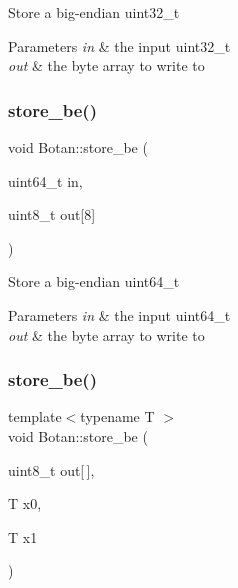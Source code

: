 Store a big-\/endian uint32\+\_\+t 
\begin{DoxyParams}{Parameters}
{\em in} & the input uint32\+\_\+t \\
\hline
{\em out} & the byte array to write to \\
\hline
\end{DoxyParams}
\mbox{\label{namespace_botan_af55277e5a97f10bb1f19a121bfcce030}} 
\subsubsection{\texorpdfstring{store\+\_\+be()}{store\_be()}\hspace{0.1cm}{\footnotesize\ttfamily [3/6]}}
{\footnotesize\ttfamily void Botan\+::store\+\_\+be (\begin{DoxyParamCaption}\item[{uint64\+\_\+t}]{in,  }\item[{uint8\+\_\+t}]{out\mbox{[}8\mbox{]} }\end{DoxyParamCaption})\hspace{0.3cm}{\ttfamily [inline]}}

Store a big-\/endian uint64\+\_\+t 
\begin{DoxyParams}{Parameters}
{\em in} & the input uint64\+\_\+t \\
\hline
{\em out} & the byte array to write to \\
\hline
\end{DoxyParams}
\mbox{\label{namespace_botan_adf2d43d6f22f9440efca19d126179271}} 
\subsubsection{\texorpdfstring{store\+\_\+be()}{store\_be()}\hspace{0.1cm}{\footnotesize\ttfamily [4/6]}}
{\footnotesize\ttfamily template$<$typename T $>$ \\
void Botan\+::store\+\_\+be (\begin{DoxyParamCaption}\item[{uint8\+\_\+t}]{out\mbox{[}$\,$\mbox{]},  }\item[{T}]{x0,  }\item[{T}]{x1 }\end{DoxyParamCaption})\hspace{0.3cm}{\ttfamily [inline]}}

